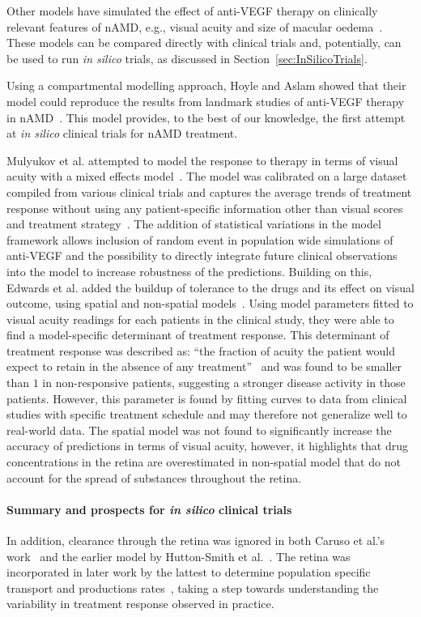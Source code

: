 \documentclass{article}
\begin{document}
Other models have simulated the effect of anti-VEGF therapy on clinically relevant features of nAMD, e.g., visual acuity and size of macular oedema~\cite{Edwards_2020, Hoyle_2017, Mulyukov_2018}.
These models can be compared directly with clinical trials and, potentially, can be used to run \textit{in silico} trials, as discussed in Section~\ref{sec:InSilicoTrials}.

Using a compartmental modelling approach, Hoyle and Aslam showed that their model could reproduce the results from landmark studies of anti-VEGF therapy in nAMD~\cite{Hoyle_2017}.
This model provides, to the best of our knowledge, the first attempt at \textit{in silico} clinical trials for nAMD treatment. 

Mulyukov et al. attempted to model the response to therapy in terms of visual acuity with a mixed effects model~\cite{Mulyukov_2018}.
The model was calibrated on a large dataset compiled from various clinical trials and captures the average trends of treatment response without using any patient-specific information other than visual scores and treatment strategy~\cite{Mulyukov_2018}.
The addition of statistical variations in the model framework allows inclusion of random event in population wide simulations of anti-VEGF and the possibility to directly integrate future clinical observations into the model to increase robustness of the predictions.
Building on this, Edwards et al. added the buildup of tolerance to the drugs and its effect on visual outcome, using spatial and non-spatial models~\cite{Edwards_2020}.
Using model parameters fitted to visual acuity readings for each patients in the clinical study, they were able to find a model-specific determinant of treatment response.
This determinant of treatment response was described as: ``the fraction of acuity the patient would expect to retain in the absence of any treatment''~\cite{Edwards_2020} and was found to be smaller than $1$ in non-responsive patients, suggesting a stronger disease activity in those patients.
However, this parameter is found by fitting curves to data from clinical studies with specific treatment schedule and may therefore not generalize well to real-world data.
The spatial model was not found to significantly increase the accuracy of predictions in terms of visual acuity, however, it highlights that drug concentrations in the retina are overestimated in non-spatial model that do not account for the spread of substances throughout the retina. 

\paragraph*{Summary and prospects for \textit{in silico} clinical trials}
In addition, clearance through the retina was ignored in both Caruso et al.'s work~\cite{Caruso_2020} and the earlier model by Hutton-Smith et al.~\cite{HuttonSmith_2016}.
The retina was incorporated in later work by the lattest to determine population specific transport and productions rates~\cite{HuttonSmith_2017, HuttonSmith_2018}, taking a step towards understanding the variability in treatment response observed in practice.
\end{document}
